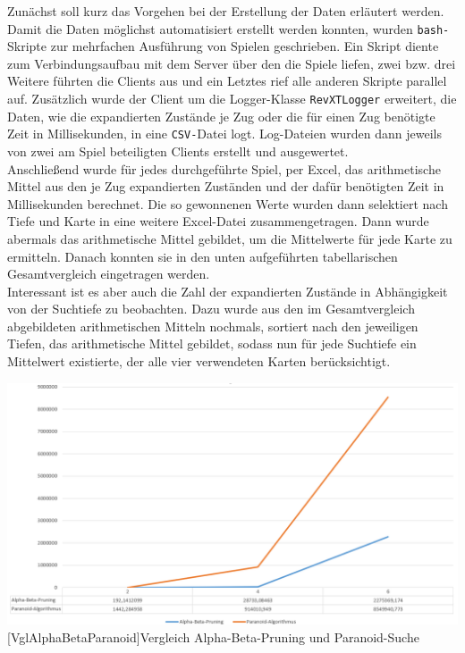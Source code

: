 \documentclass[12pt,a4paper,bibliography=totocnumbered,listof=totocnumbered,ngerman]{scrartcl}
\begin{document}
Zunächst soll kurz das Vorgehen bei der Erstellung der Daten erläutert werden. \\
Damit die Daten möglichst automatisiert erstellt werden konnten, wurden \texttt{bash-}Skripte zur mehrfachen Ausführung von Spielen geschrieben. Ein Skript diente zum Verbindungsaufbau mit dem Server über den die Spiele liefen, zwei bzw. drei Weitere führten die Clients aus und ein Letztes rief alle anderen Skripte parallel auf. Zusätzlich wurde der Client um die Logger-Klasse \texttt{RevXTLogger} erweitert, die Daten, wie die expandierten Zustände je Zug oder die für einen Zug benötigte Zeit in Millisekunden, in eine \texttt{CSV-}Datei logt. Log-Dateien wurden dann jeweils von zwei am Spiel beteiligten Clients erstellt und ausgewertet.\\
Anschließend wurde für jedes durchgeführte Spiel, per Excel, das arithmetische Mittel aus den je Zug expandierten Zuständen und der dafür benötigten Zeit in Millisekunden berechnet. Die so gewonnenen Werte wurden dann selektiert nach Tiefe und Karte in eine weitere Excel-Datei zusammengetragen. Dann wurde abermals das arithmetische Mittel gebildet, um die Mittelwerte für jede Karte zu ermitteln. Danach konnten sie in den unten aufgeführten tabellarischen Gesamtvergleich eingetragen werden.\\
Interessant ist es aber auch die Zahl der expandierten Zustände in Abhängigkeit von der Suchtiefe zu beobachten. Dazu wurde aus den im Gesamtvergleich abgebildeten arithmetischen Mitteln nochmals, sortiert nach den jeweiligen Tiefen, das arithmetische Mittel gebildet, sodass nun für jede Suchtiefe ein Mittelwert existierte, der alle vier verwendeten Karten berücksichtigt.\\
  
\vspace{1em}
\begin{minipage}{\linewidth}
	\centering
	\includegraphics[width=0.9\linewidth]{pics/VglABParanoid.png}
	[VglAlphaBetaParanoid]{Vergleich Alpha-Beta-Pruning und Paranoid-Suche}
	\label{fig:VglAlphaBetaBaranoid}
\end{minipage}
\end{document}

